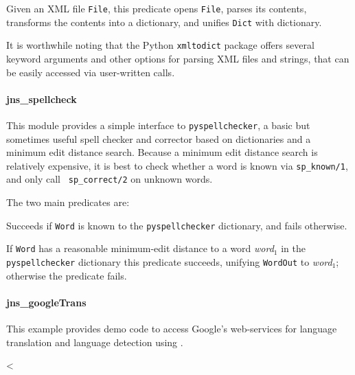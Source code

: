\begin{description}
  
  Given an XML file {\tt File}, this predicate opens {\tt File},
  parses its contents, transforms the contents into a dictionary, and
  unifies {\tt Dict} with dictionary.  
\end{description}

\noindent
It is worthwhile noting that the Python {\tt xmltodict} package offers
several keyword arguments and other options for parsing XML files and
strings, that can be easily accessed via user-written \janus{} calls.

\paragraph{jns\_spellcheck}
This module provides a simple interface to {\tt pyspellchecker}, a
basic but sometimes useful spell checker and corrector based on
dictionaries and a minimum edit distance search.  Because a minimum
edit distance search is relatively expensive, it is best to check
whether a word is known via {\tt sp\_known/1}, and only call {\tt
  sp\_correct/2} on unknown words.

The two main predicates are:
\begin{description}
 Succeeds
  if {\tt Word} is known to the {\tt pyspellchecker} dictionary, and
  fails otherwise.

  If {\tt Word} has a reasonable minimum-edit distance to a word {\em
    word$_1$} in the {\tt pyspellchecker} dictionary this predicate
  succeeds, unifying {\tt WordOut} to {\em word$_1$}; otherwise the
  predicate fails.
\end{description}


\paragraph{jns\_googleTrans}
This example provides demo code to access Google's web-services for
language translation and language detection using \janus .





<
